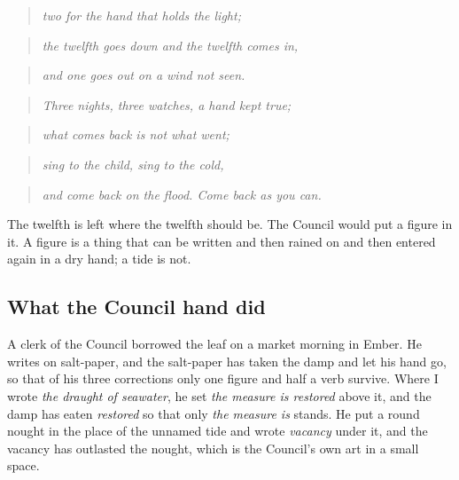 \documentclass{design/chronicle}
\begin{document}
\begin{quote}\itshape two for the hand that holds the light;\end{quote}

\begin{quote}\itshape the twelfth goes down and the twelfth comes in,\end{quote}

\begin{quote}\itshape and one goes out on a wind not seen.\end{quote}

\begin{quote}\itshape \end{quote}

\begin{quote}\itshape Three nights, three watches, a hand kept true;\end{quote}

\begin{quote}\itshape what comes back is not what went;\end{quote}

\begin{quote}\itshape sing to the child, sing to the cold,\end{quote}

\begin{quote}\itshape and come back on the flood. Come back as you can.\end{quote}

The twelfth is left where the twelfth should be. The Council would put a figure in it. A figure is a thing that can be written and then rained on and then entered again in a dry hand; a tide is not.

\subsection*{What the Council hand did}

A clerk of the Council borrowed the leaf on a market morning in Ember. He writes on salt-paper, and the salt-paper has taken the damp and let his hand go, so that of his three corrections only one figure and half a verb survive. Where I wrote \emph{the draught of seawater}, he set \emph{the measure is restored} above it, and the damp has eaten \emph{restored} so that only \emph{the measure is} stands. He put a round nought in the place of the unnamed tide and wrote \emph{vacancy} under it, and the vacancy has outlasted the nought, which is the Council’s own art in a small space.
\end{document}
